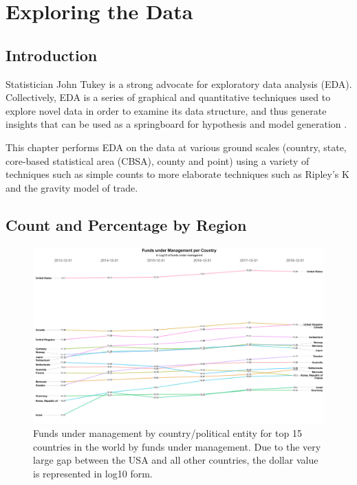 \chapter{Exploring the Data}
\label{ChapterIIIb}
\section{Introduction}

Statistician John Tukey is a strong advocate for exploratory data analysis (EDA).  Collectively, EDA is a series of graphical and quantitative techniques used to explore novel data in order to examine its data structure, and thus generate insights that can be used as a springboard for hypothesis and model generation \citep{tukey77,Hoaglin1982}.  

This chapter performs EDA on the data at various ground scales (country, state, core-based statistical area (CBSA), county and point) using a variety of techniques such as simple counts to more elaborate techniques such as Ripley's K and the gravity model of trade. 

\section{Count and Percentage by Region}
\begin{figure}[ht]
	\centering
	\includegraphics[width=1\linewidth]{Figures/ChapterIII/Funds_Per_Country_Slopegraph}
	\caption[Funds Under Management per Country in Log10]{Funds under management by country/political entity for top 15 countries in the world by funds under management.  Due to the very large gap between the USA and all other countries, the dollar value is represented in log10 form.}
	\label{fig:fundspercountryslopegraph}
\end{figure}


